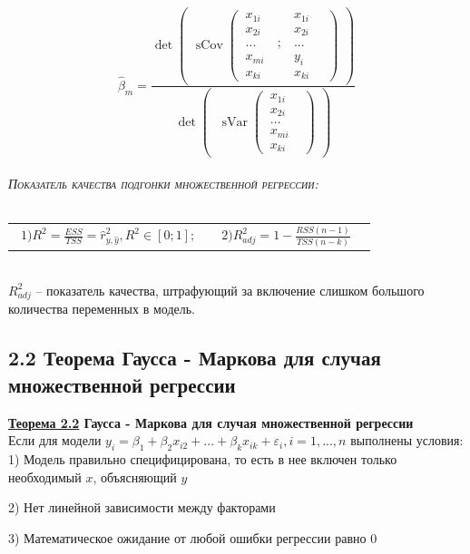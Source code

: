 \documentclass[a0,final]{a0poster}
\DeclareMathOperator{\sVar}{sVar}
\DeclareMathOperator{\sCov}{sCov}
\DeclareMathOperator{\E}{E}
\begin{document}
\begin{multicols}{4}
\[\hat{\beta}_m = \frac{\det{\begin{pmatrix}
\sCov{\begin{pmatrix}
  \ x_{1i}& \ & \ x_{1i}&\\
  \ x_{2i}& \ & \ x_{2i}&\\
  \ ...& \ ;& \ ...&\\
  \ x_{mi}& \ &\ y_i&\\
  \ x_{ki}&\ & \ x_{ki}\
  \end{pmatrix}}\end{pmatrix}}}{\det{\begin{pmatrix}
\ \sVar{\begin{pmatrix}
  \ x_{1i}& \\
  \ x_{2i}& \\
  \ ...& \\
  \ x_{mi}& \\
  \ x_{ki}&
  \end{pmatrix}}\end{pmatrix}}}\]
\\
\textsc{\textit{Показатель качества подгонки множественной регрессии:}} \\
\\
\begin{tabular}{r  l}\
$ 1) R^2 = \frac{ESS}{TSS} = \hat{r}^2_{y,\hat{y}}, R^2 \in [0;1]; \qquad 2) R^2_{adj} = 1 - \frac{RSS(n-1)}{TSS(n-k)}$
\end{tabular}
\\
$R^2_{adj}$ -- показатель качества, штрафующий за включение слишком большого количества переменных в модель.

\subsection*{\textbf{2.2 Теорема Гаусса - Маркова для случая множественной регрессии}}
\begin{tcolorbox}[colback=red!5!white,colframe=red!75!black]
\textbf{\underline{Теорема 2.2} Гаусса - Маркова для случая множественной регрессии}\\
Если для модели $y_i={\beta}_1 +{\beta}_2x_{i2} + ... + \beta_kx_{ik} + {\varepsilon}_i, i = 1,...,n$ выполнены условия: \\
1) Модель правильно специфицирована, то есть в нее включен только необходимый $x$, объясняющий $y$

2) Нет линейной зависимости между факторами

3) %
Математическое ожидание от любой ошибки регрессии равно 0


\end{tcolorbox}
\end{multicols}
\end{document}
